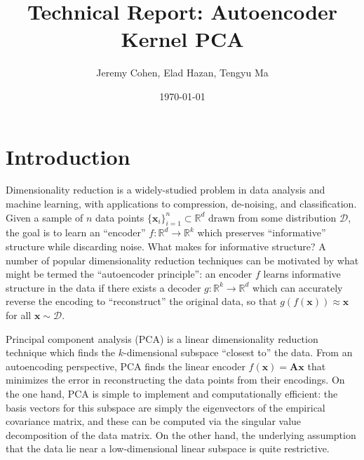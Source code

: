 \documentclass[]{article}
\newcommand{\reals}{\mathbb{R}}
\begin{document}
\title{Technical Report: Autoencoder Kernel PCA}
\author{Jeremy Cohen, Elad Hazan, Tengyu Ma}
\date{\today}
\maketitle

\section{Introduction}
Dimensionality reduction is a widely-studied problem in data analysis and machine learning, with applications to compression, de-noising, and classification.
Given a sample of $n$ data points $\{\mathbf{x}_i\}_{i=1}^n \subset \reals^d$ drawn from some distribution $\mathcal{D}$, the goal is to learn an ``encoder'' $f: \reals^d \to \reals^k$ which preserves ``informative'' structure while discarding noise.
What makes for informative structure?
A number of popular dimensionality reduction techniques can be motivated by what might be termed the ``autoencoder principle'': an encoder $f$ learns informative structure in the data if there exists a decoder $g: \reals^k \to \reals^d$ which can accurately reverse the encoding to ``reconstruct'' the original data, so that $g(f(\mathbf{x})) \approx \mathbf{x}$ for all $\mathbf{x} \sim \mathcal{D}$.

Principal component analysis (PCA) is a linear dimensionality reduction technique which finds the $k$-dimensional subspace ``closest to'' the data.
From an autoencoding perspective, PCA finds the linear encoder $f(\mathbf{x}) = \mathbf{A} \mathbf{x}$ that minimizes the error in reconstructing the data points from their encodings.
On the one hand, PCA is simple to implement and computationally efficient: the basis vectors for this subspace are simply the eigenvectors of the empirical covariance matrix, and these can be computed via the singular value decomposition of the data matrix.
On the other hand, the underlying assumption that the data lie near a low-dimensional linear subspace is quite restrictive.
\end{document}
